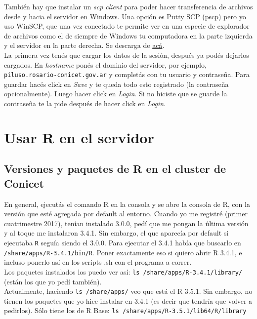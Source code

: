\documentclass[paper=a4, fontsize=11pt]{scrartcl} %
\numberwithin{equation}{section} %
\numberwithin{figure}{section} %
\numberwithin{table}{section} %
\begin{document}
También hay que instalar un \textit{scp client} para poder hacer transferencia de archivos desde y hacia el servidor en Windows. Una opción es Putty SCP (pscp) pero yo uso WinSCP, que una vez conectado te permite ver en una especie de explorador de archivos como el de siempre de Windows tu computadora en la parte izquierda y el servidor en la parte derecha. Se descarga de \href{https://winscp.net/eng/download.php}{acá}.\\

La primera vez tenés que cargar los datos de la sesión, después ya podés dejarlos cargados. En \textit{hostname} ponés el dominio del servidor, por ejemplo, \texttt{piluso.rosario-conicet.gov.ar} y completás con tu usuario y contraseña. Para guardar hacés click en \textit{Save} y te queda todo esto registrado (la contraseña opcionalmente). Luego hacer click en \textit{Login}.  Si no hiciste que se guarde la contraseña te la pide después de hacer click en \textit{Login}.

\section{Usar R en el servidor}

\subsection{Versiones y paquetes de R en el cluster de Conicet}

En general, ejecutás el comando R en la consola y se abre la consola de R, con la versión que esté agregada por default al entorno. Cuando yo me registré (primer cuatrimestre 2017), tenían instalado 3.0.0, pedí que me pongan la última versión y al toque me instalaron 3.4.1. Sin embargo, el que aparecía por default si ejecutaba \texttt{R} seguía siendo el 3.0.0. Para ejecutar el 3.4.1 había que buscarlo en \texttt{/share/apps/R-3.4.1/bin/R}. Poner exactamente eso si quiero abrir R 3.4.1, e incluso ponerlo así en los scripts .sh con el programa a correr.\\

Los paquetes instalados los puedo ver así: \texttt{ls /share/apps/R-3.4.1/library/} (están los que yo pedí también).\\

Actualmente, haciendo \texttt{ls /share/apps/} veo que está el R 3.5.1. Sin embargo, no tienen los paquetes que yo hice instalar en 3.4.1 (es decir que tendría que volver a pedirlos). Sólo tiene los de R Base:
\texttt{ls /share/apps/R-3.5.1/lib64/R/library}
\end{document}
